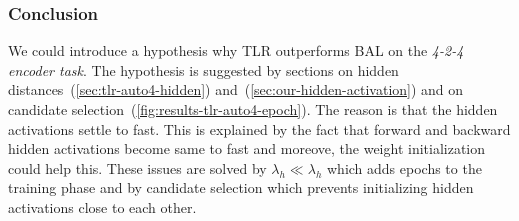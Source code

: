 \subsubsection{Conclusion} 
\label{sec:tlr-auto4-conclusion} 

\label{sec:tlr-auto4-hypothesis} 
We could introduce a hypothesis why TLR outperforms BAL on the \emph{4-2-4 encoder task}. The hypothesis is suggested by sections on hidden distances~(\ref{sec:tlr-auto4-hidden}) and~(\ref{sec:our-hidden-activation}) and on candidate selection~(\ref{fig:results-tlr-auto4-epoch}). The reason is that the hidden activations settle to fast. This is explained by the fact that forward and backward hidden activations become same to fast and moreove, the weight initialization could help this. These issues are solved by $\lambda_h \ll \lambda_h$ which adds epochs to the training phase and by candidate selection which prevents initializing hidden activations close to each other. 


